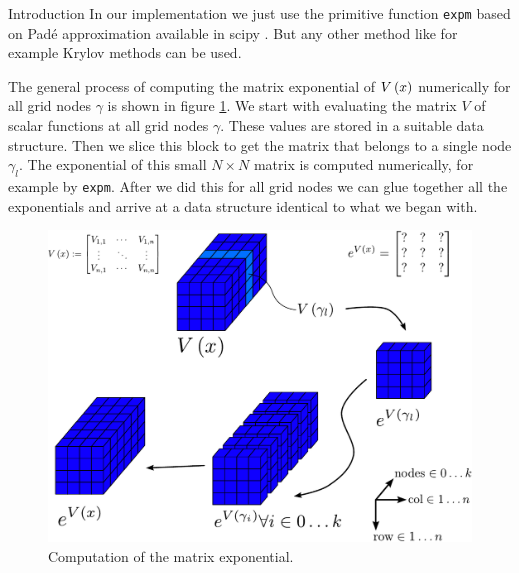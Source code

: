 \begin{chapter}{Introduction}
In our implementation we just use the primitive function \texttt{expm} based on
Padé approximation available in scipy \cite{scipy}. But any other method like
for example Krylov methods can be used.

The general process of computing the matrix exponential of $V\left( x \right)$ numerically
for all grid nodes $\gamma$ is shown in figure \ref{fig:matrix_exponential_num}.
We start with evaluating the matrix $V$ of scalar functions at all grid nodes $\gamma$.
These values are stored in a suitable data structure. Then we slice this block
to get the matrix that belongs to a single node $\gamma_l$. The exponential of
this small $N \times N$ matrix is computed numerically, for example by \texttt{expm}.
After we did this for all grid nodes we can glue together all the exponentials
and arrive at a data structure identical to what we began with.

\begin{figure}[h]
  \centering
  \includegraphics[width=0.8\linewidth]{./figures/matrix_exponential_num.pdf}
  \caption{Computation of the matrix exponential.}
  \label{fig:matrix_exponential_num}
\end{figure}


\end{chapter}